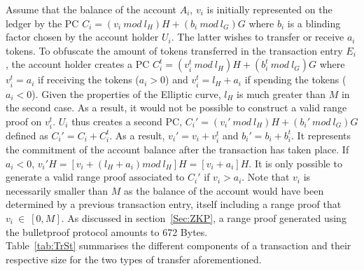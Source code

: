 Assume that the balance of the account $A_i$, $v_i$ is initially represented on the ledger by the PC $C_{i}=(v_i~mod~l_H)H+ (b_i~mod~l_G)G$ where $b_i$ is a blinding factor chosen by the account holder $U_i$. The latter wishes to transfer or receive $a_i$ tokens. To obfuscate the amount of tokens transferred in the transaction entry $E_i$, the account holder creates a PC 
$C_i^{t} = (v_i^{t}~mod~l_H)H+ (b_i^{t}~mod~l_G)G$ where $v_i^{t} = a_i$ if receiving the tokens ($a_i > 0$) and $v_i^{t} = l_H+a_i$ if spending the tokens ($a_i<0$). Given the properties of the Elliptic curve, $l_H$ is much greater than $M$ in the second case. As a result, it would not be possible to construct a valid range proof on $v_i^{t}$. $U_i$ thus creates a second PC, $C_{i}'=(v_i'~mod~l_H)H+ (b_i'~mod~l_G)G$ defined as $C_{i}' = C_i + C_i^{t}$. As a result, $v_i' = v_i + v_i^t$ and $b_i' = b_i + b_i^t$. It represents the commitment of the account balance after the transaction has taken place.  If $a_i<0$, $v_i'H = [v_i + (l_H+a_i)mod~l_H]H = [v_i + a_i]H$. It is only possible to generate a valid range proof associated to $C_{i}'$ if $v_i > a_i$. Note that $v_i$ is necessarily smaller than $M$ as the balance of the account would have been determined by a previous transaction entry, itself including a range proof that $v_i~\in~[0,M]$. As discussed in section~\ref{Sec:ZKP}, a range proof generated using the bulletproof protocol amounts to 672 Bytes.  \\

Table~\ref{tab:TrSt} summarises the different components of a transaction and their respective size for the two types of transfer aforementioned. 

